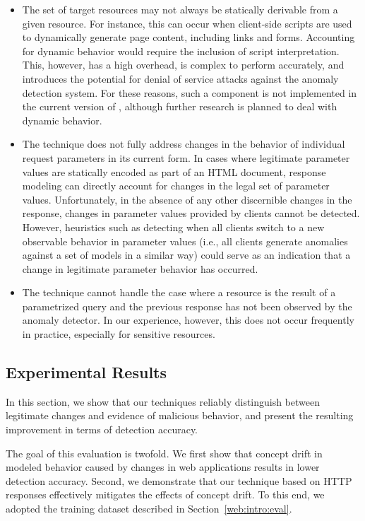 \begin{itemize}
\item The set of target resources may not always be statically derivable from a given resource. For instance, this can occur when client-side scripts are used to dynamically generate page content, including links and forms.  Accounting for dynamic behavior would require the inclusion of script interpretation.  This, however, has a high overhead, is complex to perform accurately, and introduces the potential for denial of service attacks against the anomaly detection system.  For these reasons, such a component is not implemented in the current version of \webanomaly, although further research is planned to deal with dynamic behavior.

\item The technique does not fully address changes in the behavior of individual request parameters in its current form.  In cases where legitimate parameter values are statically encoded as part of an \ac{HTML} document, response modeling can directly account for changes in the legal set of parameter values.  Unfortunately, in the absence of any other discernible changes in the response, changes in parameter values provided by clients cannot be detected. However, heuristics such as detecting when all clients switch to a new observable behavior in parameter values (i.e., all clients generate anomalies against a set of models in a similar way) could serve as an indication that a change in legitimate parameter behavior has occurred.

\item The technique cannot handle the case where a resource is the result of a parametrized query and the previous response has not been observed by the anomaly detector.  In our experience, however, this does not occur frequently in practice, especially for sensitive resources.
\end{itemize}

\subsection{Experimental Results}
\label{web:conceptdrift:eval}
In this section, we show that our techniques reliably distinguish between legitimate changes and evidence of malicious behavior, and present the resulting improvement in terms of detection accuracy.

The goal of this evaluation is twofold. We first show that concept drift in modeled behavior caused by changes in web applications results in lower detection accuracy. Second, we demonstrate that our technique based on \ac{HTTP} responses effectively mitigates the effects of concept drift. To this end, we adopted the training dataset described in Section~\ref{web:intro:eval}.

